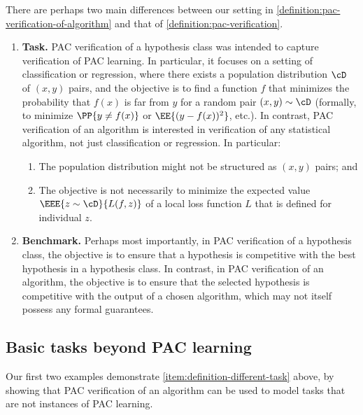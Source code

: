 There are perhaps two main differences between our setting in \cref{definition:pac-verification-of-algorithm} and that of \cref{definition:pac-verification}. 
\begin{enumerate}
	\item{
		\label{item:definition-different-task}
		\textbf{Task.} PAC verification of a hypothesis class was intended to capture verification of PAC learning. In particular, it focuses on a setting of classification or regression, where there exists a population distribution $\cD$ of $(x,y)$ pairs, and the objective is to find a function $f$ that minimizes the probability that $f(x)$ is far from $y$ for a random pair $(x,y) \sim \cD$ (formally, to minimize $\PP{y \neq f(x)}$ or $\EE{(y-f(x))^2}$, etc.). 
		In contrast, PAC verification of an algorithm is interested in verification of any statistical algorithm, not just classification or regression. In particular:
		\begin{enumerate}
			\item{
				\label{item:population-not-x-y}
				The population distribution might not be structured as $(x,y)$ pairs; and
			}
			\item{
				\label{item:objective-not-local-expectation}
				The objective is not necessarily to minimize the expected value $\EEE{z \sim \cD}{L(f, z)}$ of a local loss function $L$ that is defined for individual $z$.
			}
		\end{enumerate}
	}
	\item{
		\label{item:definition-different-benchmark}
		\textbf{Benchmark.} Perhaps most importantly, in PAC verification of a hypothesis class, the objective is to ensure that a hypothesis is competitive with the best hypothesis in a hypothesis class. In contrast, in PAC verification of an algorithm, the objective is to ensure that the selected hypothesis is competitive with the output of a chosen algorithm, which may not itself possess any formal guarantees.
	}
\end{enumerate}


\subsection{Basic tasks beyond PAC learning}


Our first two examples demonstrate \cref{item:definition-different-task} above, by showing that PAC verification of an algorithm can be used to model tasks that are not instances of PAC learning.

